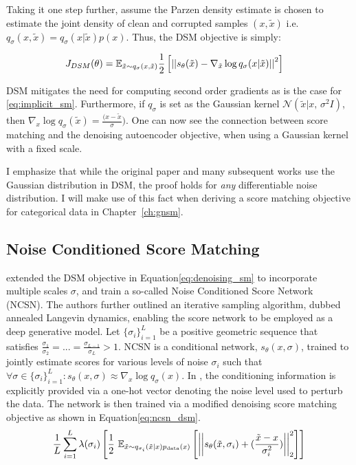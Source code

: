 Taking it one step further, assume the Parzen density estimate is chosen to estimate the joint density of clean and corrupted samples $(x, \tilde{x})$ i.e. $q_{\sigma}(x, \tilde{x}) = q_{\sigma}(x | \tilde{x} ) p(x) $. Thus, the DSM objective is simply:

\begin{align}
\label{eq:denoising_sm}
    J_{DSM}(\theta) &= \mathbb{E}_{\tilde{x}\sim q_{\sigma}(x, \tilde{x})} \frac{1}{2} \left[ { \left|\left| {s_\theta(\tilde{x}) - \nabla_{\tilde{x}} \log q_{\sigma}(x | \tilde{x}) } \right|\right|^2 } \right]
\end{align}

DSM mitigates the need for computing second order gradients as is the case for \ref{eq:implicit_sm}. Furthermore, if $q_{\sigma}$ is set as the Gaussian kernel $\mathcal{N}(\tilde{x} |  x,\,\sigma^{2}I)$, then $\nabla_x \log q_{\sigma}(\tilde{x}) = \frac{(x - \tilde{x}}{\sigma})$. One can now see the connection between score matching and the denoising autoencoder objective, when using a Gaussian kernel with a fixed scale.

I emphasize that while the original paper and many subsequent works  use the Gaussian distribution in DSM, the proof holds for \textit{any} differentiable noise distribution.
I will make use of this fact when deriving a score matching objective for categorical data in Chapter~\ref{ch:gnsm}.

\subsection{Noise Conditioned Score Matching}

 extended the DSM objective in Equation\ref{eq:denoising_sm} to incorporate multiple scales $\sigma$, and train a so-called Noise Conditioned Score Network (NCSN). The authors further outlined an iterative sampling algorithm, dubbed annealed Langevin dynamics, enabling the score network to be employed as a deep generative model. Let $\{\sigma_i\}_{i=1}^L$ be a positive geometric sequence that satisfies $\frac{\sigma_1}{\sigma_2} = ... = \frac{\sigma_{L-1}}{\sigma_{L}} >  1$. NCSN is a conditional network, $s_{\theta}(x,\sigma)$, trained to jointly estimate scores for various levels of noise $\sigma_i$ such that $\forall \sigma \in \{\sigma_i\}_{i=1}^L: s_{\theta}(x,\sigma) \approx \nabla_x \log q_{\sigma}(x)$. In \cite{Song2019}, the conditioning information is explicitly provided via a one-hot vector denoting the noise level used to perturb the data. The network is then trained via a modified denoising score matching objective as shown in Equation\ref{eq:ncsn_dsm}.
\begin{equation}
\label{eq:ncsn_dsm}
\frac{1}{L} \sum_{i=1}^L \lambda(\sigma_i)
\left[ {\frac{1}{2} \displaystyle \text{~} \mathbb{E}_{\tilde{x}\sim q_{\sigma_i} (\tilde{x}|x) p_{\text{data}}(x)} \left[ { \left|\left| { s_{\theta}(\tilde{x}, \sigma_i) + (\frac{\tilde{x} - x}{\sigma_i^2}) } \right|\right|^2_2  } \right] } \right]
\end{equation}

